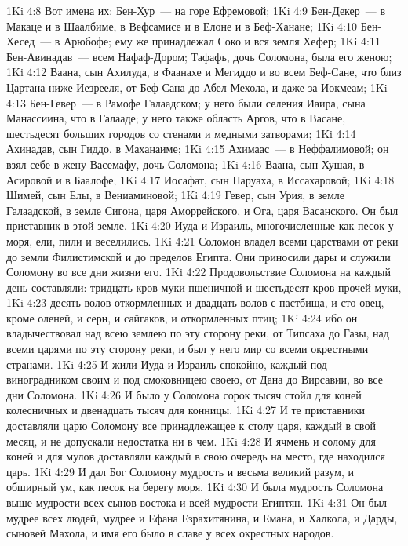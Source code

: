 \vs 1Ki 4:8 Вот имена их: Бен-Хур~--- на горе Ефремовой;
\vs 1Ki 4:9 Бен-Декер~--- в Макаце и в Шаалбиме, в Вефсамисе и в Елоне и в Беф-Ханане;
\vs 1Ki 4:10 Бен-Хесед~--- в Арюбофе; ему же принадлежал Соко и вся земля Хефер;
\vs 1Ki 4:11 Бен-Авинадав~---  всем Нафаф-Дором; Тафафь, дочь Соломона, была его женою;
\vs 1Ki 4:12 Ваана, сын Ахилуда, в Фаанахе и Мегиддо и во всем Беф-Сане, что близ Цартана ниже Иезрееля, от Беф-Сана до Абел-Мехола, и даже за Иокмеам;
\vs 1Ki 4:13 Бен-Гевер~--- в Рамофе Галаадском; у него были селения Иаира, сына Манассиина, что в Галааде; у него также область Аргов, что в Васане, шестьдесят больших городов со стенами и медными затворами;
\vs 1Ki 4:14 Ахинадав, сын Гиддо, в Маханаиме;
\vs 1Ki 4:15 Ахимаас~--- в  Неффалимовой; он взял себе в жену Васемафу, дочь Соломона;
\vs 1Ki 4:16 Ваана, сын Хушая, в  Асировой и в Баалофе;
\vs 1Ki 4:17 Иосафат, сын Паруаха, в  Иссахаровой;
\vs 1Ki 4:18 Шимей, сын Елы, в  Вениаминовой;
\vs 1Ki 4:19 Гевер, сын Урия, в земле Галаадской, в земле Сигона, царя Аморрейского, и Ога, царя Васанского. Он был приставник в этой земле.
\vs 1Ki 4:20 Иуда и Израиль, многочисленные как песок у моря, ели, пили и веселились.
\vs 1Ki 4:21 Соломон владел всеми царствами от реки  до земли Филистимской и до пределов Египта. Они приносили дары и служили Соломону во все дни жизни его.
\vs 1Ki 4:22 Продовольствие Соломона на каждый день составляли: тридцать кров муки пшеничной и шестьдесят кров прочей муки,
\vs 1Ki 4:23 десять волов откормленных и двадцать волов с пастбища, и сто овец, кроме оленей, и серн, и сайгаков, и откормленных птиц;
\vs 1Ki 4:24 ибо он владычествовал над всею землею по эту сторону реки, от Типсаха до Газы, над всеми царями по эту сторону реки, и был у него мир со всеми окрестными странами.
\vs 1Ki 4:25 И жили Иуда и Израиль спокойно, каждый под виноградником своим и под смоковницею своею, от Дана до Вирсавии, во все дни Соломона.
\vs 1Ki 4:26 И было у Соломона сорок тысяч стойл для коней колесничных и двенадцать тысяч для конницы.
\vs 1Ki 4:27 И те приставники доставляли царю Соломону все принадлежащее к столу царя, каждый в свой месяц, и не допускали недостатка ни в чем.
\vs 1Ki 4:28 И ячмень и солому для коней и для мулов доставляли каждый в свою очередь на место, где находился царь.
\rsbpar\vs 1Ki 4:29 И дал Бог Соломону мудрость и весьма великий разум, и обширный ум, как песок на берегу моря.
\vs 1Ki 4:30 И была мудрость Соломона выше мудрости всех сынов востока и всей мудрости Египтян.
\vs 1Ki 4:31 Он был мудрее всех людей, мудрее и Ефана Езрахитянина, и Емана, и Халкола, и Дарды, сыновей Махола, и имя его было в славе у всех окрестных народов.
